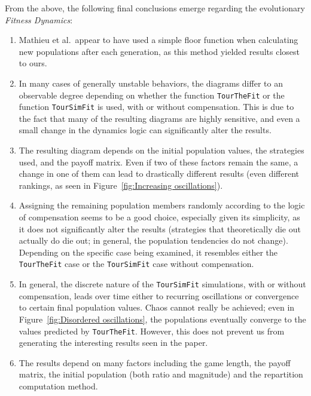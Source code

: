 From the above, the following final conclusions emerge regarding the evolutionary \textit{Fitness Dynamics}:

\begin{enumerate}
    \item Mathieu et al.\ appear to have used a simple floor function when calculating new populations after each generation, as this method yielded results closest to ours.

    \item In many cases of generally unstable behaviors, the diagrams differ to an observable degree depending on whether the function \texttt{TourTheFit} or the function \texttt{TourSimFit} is used, with or without compensation. This is due to the fact that many of the resulting diagrams are highly sensitive, and even a small change in the dynamics logic can significantly alter the results.

    \item The resulting diagram depends on the initial population values, the strategies used, and the payoff matrix. Even if two of these factors remain the same, a change in one of them can lead to drastically different results (even different rankings, as seen in Figure~\ref{fig:Increasing oscillations}).

    \item Assigning the remaining population members randomly according to the logic of compensation seems to be a good choice, especially given its simplicity, as it does not significantly alter the results (strategies that theoretically die out actually do die out; in general, the population tendencies do not change). Depending on the specific case being examined, it resembles either the \texttt{TourTheFit} case or the \texttt{TourSimFit} case without compensation.

    \item In general, the discrete nature of the \texttt{TourSimFit} simulations, with or without compensation, leads over time either to recurring oscillations or convergence to certain final population values. Chaos cannot really be achieved; even in Figure~\ref{fig:Disordered oscillations}, the populations eventually converge to the values predicted by \texttt{TourTheFit}. However, this does not prevent us from generating the interesting results seen in the paper.
    
    \item The results depend on many factors including the game length, the payoff matrix, the initial population (both ratio and magnitude) and the repartition computation method.
\end{enumerate}